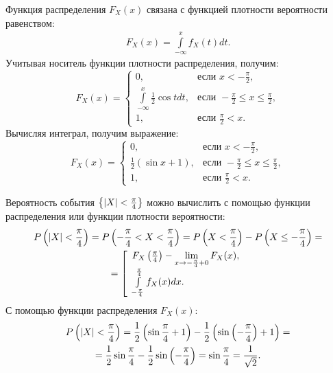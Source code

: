 Функция распределения $F_X(x)$ связана с функцией плотности вероятности равенством:
\begin{gather}
    F_X(x) = \int \limits_{-\infty}^x f_X(t) dt .
\end{gather}
Учитывая носитель функции плотности распределения, получим:
\begin{equation}
    F_X(x)
    = \left \{
    \begin{array}{ll}
        0,                                              & \text{если } x < - \frac{\pi}{2},                    \\
        \int \limits_{-\infty}^x \frac{1}{2} \cos t dt, & \text{если } -\frac{\pi}{2} \le x \le \frac{\pi}{2}, \\
        1,                                              & \text{если } \frac{\pi}{2} < x .
    \end{array}
    \right .
\end{equation}
Вычисляя интеграл, получим выражение:
\begin{equation}
    F_X(x)
    = \left \{
    \begin{array}{ll}
        0,                                       & \text{если } x < - \frac{\pi}{2},                    \\
        \frac{1}{2} \left ( \sin x + 1 \right ), & \text{если } -\frac{\pi}{2} \le x \le \frac{\pi}{2}, \\
        1,                                       & \text{если } \frac{\pi}{2} < x .
    \end{array}
    \right .
\end{equation}

Вероятность события $\left \{ \left | X \right | < \frac{\pi}{4} \right \}$ можно вычислить с помощью функции распределения или функции плотности вероятности:
\begin{gather}
    P \left ( \left | X \right | < \frac{\pi}{4} \right )
    = P \left ( -\frac{\pi}{4} < X < \frac{\pi}{4} \right )
    = P \left ( X < \frac{\pi}{4} \right ) - P \left ( X \le -\frac{\pi}{4} \right ) = \\
    = \left [
    \begin{array}{l}
        F_X \left ( \frac{\pi}{4} \right ) - \lim \limits_{x \rightarrow - \frac{\pi}{4}+0} F_X(x) , \\
        \int \limits_{-\frac{\pi}{4}}^{\frac{\pi}{4}} f_X(x) dx .
    \end{array}
    \right .
\end{gather}
С помощью функции распределения $F_X(x)$:
\begin{multline}
    P \left ( \left | X \right | < \frac{\pi}{4} \right )
    = \frac{1}{2} \left ( \sin \frac{\pi}{4} + 1 \right ) - \frac{1}{2} \left ( \sin \left ( - \frac{\pi}{4} \right ) + 1 \right ) = \\
    = \frac{1}{2} \sin \frac{\pi}{4} - \frac{1}{2} \sin \left ( - \frac{\pi}{4} \right )
    = \sin \frac{\pi}{4}
    = \frac{1}{\sqrt{2}} .
\end{multline}

